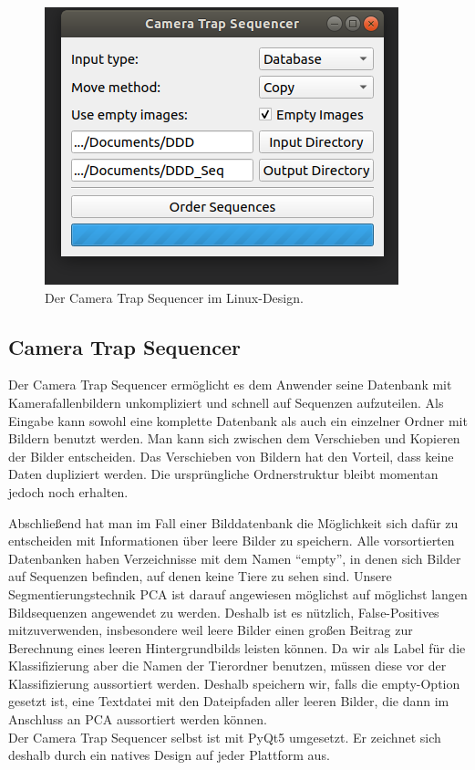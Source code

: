 \begin{figure}
	\centering
	\includegraphics[scale=0.5]{img/CameraTrapSequencer.png}
	\caption{Der Camera Trap Sequencer im Linux-Design.}
	\label{fig:SequencerGUI}
\end{figure}

\subsection{Camera Trap Sequencer}

Der Camera Trap Sequencer ermöglicht es dem Anwender seine Datenbank mit Kamerafallenbildern unkompliziert und schnell auf Sequenzen aufzuteilen. Als Eingabe kann sowohl eine komplette Datenbank als auch ein einzelner Ordner mit Bildern benutzt werden. Man kann sich zwischen dem Verschieben und Kopieren der Bilder entscheiden. Das Verschieben von Bildern hat den Vorteil, dass keine Daten dupliziert werden. Die ursprüngliche Ordnerstruktur bleibt momentan jedoch noch erhalten. 

Abschließend hat man im Fall einer Bilddatenbank die Möglichkeit sich dafür zu entscheiden mit Informationen über leere Bilder zu speichern. Alle vorsortierten Datenbanken haben Verzeichnisse mit dem Namen \enquote{empty}, in denen sich Bilder auf Sequenzen befinden, auf denen keine Tiere zu sehen sind. Unsere Segmentierungstechnik PCA ist darauf angewiesen möglichst auf möglichst langen Bildsequenzen angewendet zu werden. Deshalb ist es nützlich, False-Positives mitzuverwenden, insbesondere weil leere Bilder einen großen Beitrag zur Berechnung eines leeren Hintergrundbilds leisten können. Da wir als Label für die Klassifizierung aber die Namen der Tierordner benutzen, müssen diese vor der Klassifizierung aussortiert werden. Deshalb speichern wir, falls die empty-Option gesetzt ist, eine Textdatei mit den Dateipfaden aller leeren Bilder, die dann im Anschluss an PCA aussortiert werden können. \\
Der Camera Trap Sequencer selbst ist mit PyQt5 umgesetzt. Er zeichnet sich deshalb durch ein natives Design auf jeder Plattform aus.

